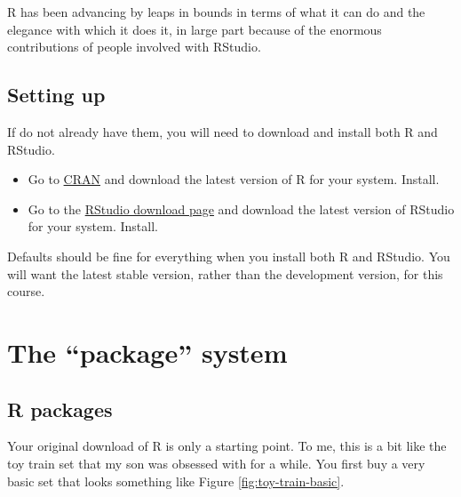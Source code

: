 \documentclass[]{book}
\providecommand{\tightlist}{%
  \setlength{\itemsep}{0pt}\setlength{\parskip}{0pt}}
\theoremstyle{definition}
\theoremstyle{definition}
\theoremstyle{definition}
\theoremstyle{remark}
\begin{document}
R has been advancing by leaps in bounds in terms of what it can do and
the elegance with which it does it, in large part because of the
enormous contributions of people involved with RStudio.

\subsection{Setting up}\label{setting-up}

If do not already have them, you will need to download and install both
R and RStudio.

\begin{itemize}
\tightlist
\item
  Go to \href{https://cran.r-project.org}{CRAN} and download the latest
  version of R for your system. Install.
\item
  Go to the
  \href{https://www.rstudio.com/products/rstudio/download/}{RStudio
  download page} and download the latest version of RStudio for your
  system. Install.
\end{itemize}

Defaults should be fine for everything when you install both R and
RStudio. You will want the latest stable version, rather than the
development version, for this course.

\section{\texorpdfstring{The ``package''
system}{The package system}}\label{the-package-system}

\subsection{R packages}\label{r-packages}

Your original download of R is only a starting point. To me, this is a
bit like the toy train set that my son was obsessed with for a while.
You first buy a very basic set that looks something like Figure
\ref{fig:toy-train-basic}.
\end{document}
